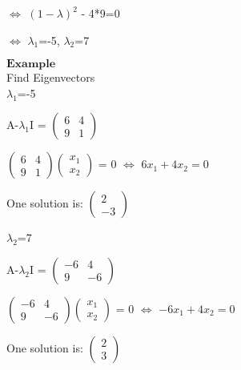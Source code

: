 \documentclass[]{article}
\begin{document}
\(\Longleftrightarrow\) \((1-\lambda)^2\) - 4*9=0\\
 \hspace{3cm}

\(\Longleftrightarrow\) \(\lambda_{1}\)=-5, \(\lambda_{2}\)=7\\
 \newpage

\(\mathbf{Example}\)\\
 Find Eigenvectors\\
 \(\lambda_{1}\)=-5

A-\(\lambda_{1}\)I = \(\begin{pmatrix} 6 & 4\\ 9 & 1\end{pmatrix}\)

\hspace{2cm}

\(\begin{pmatrix} 6 & 4\\ 9 & 1\end{pmatrix}\begin{pmatrix} x_{1}\\ x_{2}\end{pmatrix}\)
= 0 \(\Longleftrightarrow\) \(6x_{1} + 4x_{2} = 0\)\\
 \hspace{2cm}

One solution is: \(\begin{pmatrix} 2 \\ -3\end{pmatrix}\)

\(\lambda_{2}\)=7

A-\(\lambda_{2}\)I = \(\begin{pmatrix} -6 & 4\\ 9 & -6\end{pmatrix}\)

\hspace{2cm}

\(\begin{pmatrix} -6 & 4\\ 9 & -6\end{pmatrix}\begin{pmatrix} x_{1}\\ x_{2}\end{pmatrix}\)
= 0 \(\Longleftrightarrow\) \(-6x_{1} + 4x_{2} = 0\)\\
 \hspace{2cm}

One solution is: \(\begin{pmatrix} 2 \\ 3\end{pmatrix}\)
\end{document}
